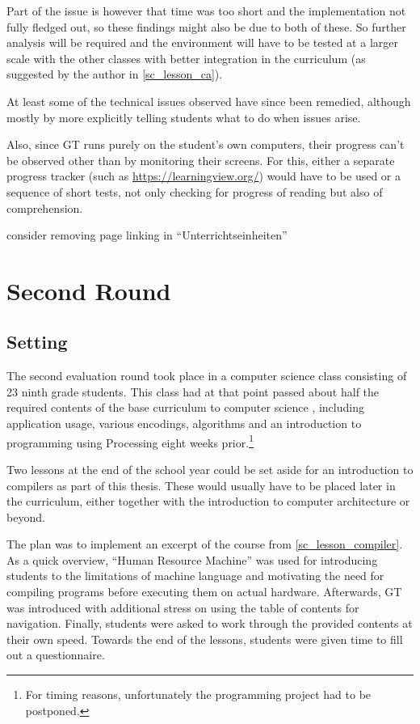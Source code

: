 Part of the issue is however that time was too short and the implementation not fully fledged out, so these findings might also be due to both of these. So further analysis will be required and the environment will have to be tested at a larger scale with the other classes with better integration in the curriculum (as suggested by the author in \ref{sc_lesson_ca}).

At least some of the technical issues observed have since been remedied, although mostly by more explicitly telling students what to do when issues arise.

Also, since GT runs purely on the student's own computers, their progress can't be observed other than by monitoring their screens. For this, either a separate progress tracker (such as \url{https://learningview.org/}) would have to be used or a sequence of short tests, not only checking for progress of reading but also of comprehension.

\begin{todo}
\item consider removing page linking in ``Unterrichtseinheiten''
\end{todo}



\section{Second Round} \label{sc_validation_compiler} %

\subsection{Setting}

The second evaluation round took place in a computer science class consisting of 23 ninth grade students. This class had at that point passed about half the required contents of the base curriculum to computer science \cite[p.\,145--146]{Erz16}, including application usage, various encodings, algorithms and an introduction to programming using Processing eight weeks prior.\footnote{For timing reasons, unfortunately the programming project had to be postponed.}

Two lessons at the end of the school year could be set aside for an introduction to compilers as part of this thesis. These would usually have to be placed later in the curriculum, either together with the introduction to computer architecture or beyond.

The plan was to implement an excerpt of the course from \ref{sc_lesson_compiler}. As a quick overview, ``Human Resource Machine'' was used for introducing students to the limitations of machine language and motivating the need for compiling programs before executing them on actual hardware. Afterwards, GT was introduced with additional stress on using the table of contents for navigation. Finally, students were asked to work through the provided contents at their own speed. Towards the end of the lessons, students were given time to fill out a questionnaire.

